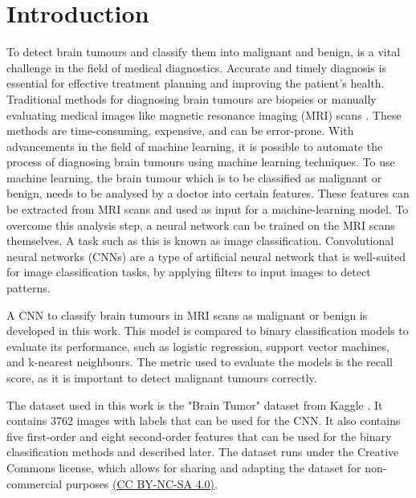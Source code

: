 \chapter{Introduction}
\label{cha:introduction}

To detect brain tumours and classify them into malignant and benign, is a vital challenge in the field of medical diagnostics. 
Accurate and timely diagnosis is essential for effective treatment planning and improving the patient's health.
Traditional methods for diagnosing brain tumours are biopsies or manually evaluating medical images like magnetic resonance imaging (MRI) scans \cite{CancerResearUK}.
These methods are time-consuming, expensive, and can be error-prone. 
With advancements in the field of machine learning, it is possible to automate the process of diagnosing brain tumours using machine learning techniques. %
To use machine learning, the brain tumour which is to be classified as malignant or benign, needs to be analysed by a doctor into certain features.
These features can be extracted from MRI scans and used as input for a machine-learning model.
To overcome this analysis step, a neural network can be trained on the MRI scans themselves.
A task such as this is known as image classification.
Convolutional neural networks (CNNs) are a type of artificial neural network that is well-suited for image classification tasks, by applying filters to input images to detect patterns.

A CNN to classify brain tumours in MRI scans as malignant or benign is developed in this work.
This model is compared to binary classification models to evaluate its performance, such as logistic regression, support vector machines, and k-nearest neighbours.
The metric used to evaluate the models is the recall score, as it is important to detect malignant tumours correctly.

The dataset used in this work is the "Brain Tumor" dataset from Kaggle \cite{jakesh_bohaju_2020}.
It contains 3762 images with labels that can be used for the CNN.
It also contains five first-order and eight second-order features that can be used for the binary classification methods and described later.
The dataset runs under the Creative Commons license, which allows for sharing and adapting the dataset for non-commercial purposes \href{https://creativecommons.org/licenses/by-nc-sa/4.0/}{(CC BY-NC-SA 4.0)}. 

